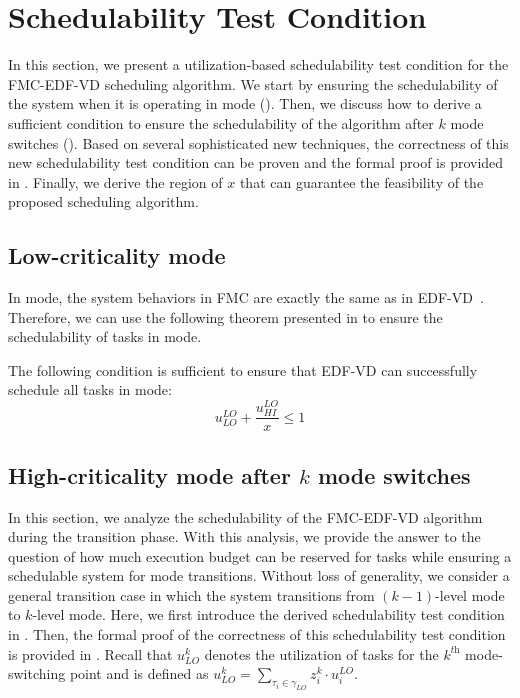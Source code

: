 \documentclass[10pt,journal,compsoc]{IEEEtran}
\begin{document}
\section{Schedulability Test Condition}
\label{sec:proof1}
\label{sec:correct}
In this section, we present a utilization-based schedulability test condition for the FMC-EDF-VD scheduling algorithm. We start by ensuring the schedulability of the system when it is operating in \lo mode (). Then, we discuss how to derive a sufficient condition to ensure the schedulability of the algorithm after $k$ mode switches (). Based on several sophisticated new techniques, the correctness of this new schedulability test condition can be proven and the formal proof is provided in . Finally, we derive the region of $x$ that can guarantee the feasibility of the proposed scheduling algorithm.  
\subsection{Low-criticality mode}
In \lo mode, the system behaviors in FMC are exactly the same as in EDF-VD~\cite{Baruah2012}. Therefore, we can use the following theorem presented in \cite{Baruah2012} to ensure the schedulability of tasks in \lo mode. 

\begin{theorem}
\label{theorem:lowcrit}
 The following condition is sufficient to ensure that EDF-VD can successfully schedule all tasks in \lo mode:
 {\small
 \begin{equation}
  \label{equation:edvVD_low_bound}
u_{LO}^{LO}+\frac{u_{HI}^{LO}}{x}\le{1}
 \end{equation}
 }
\end{theorem}

\subsection{High-criticality mode after $k$ mode switches}
In this section, we analyze the schedulability of the FMC-EDF-VD algorithm during the transition phase. With this analysis, we provide the answer to the question of how much execution budget can be reserved for \lo tasks while ensuring a schedulable system for mode transitions. Without loss of generality, we consider a general transition case in which the system transitions from $(k-1)$-level \hi mode to $k$-level \hi mode. Here, we first introduce the derived schedulability test condition in . Then, the formal proof of the correctness of this schedulability test condition is provided in . Recall that $u_{LO}^{k}$ denotes the utilization of \lo tasks for the $k^{\textit{th}}$ mode-switching point and is defined as $u_{LO}^{k}=\sum_{\tau_i\in{\gamma_{LO}}}z_i^k\cdot{}u_i^{LO}$.   
 
\end{document}
